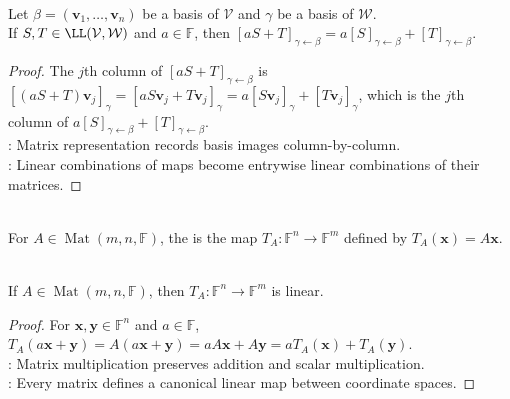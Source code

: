\begin{proposition} \label{prop:matrix-representation-respects-linear-combinations} \\
Let $\beta=(\mathbf{v}_1,\ldots,\mathbf{v}_n)$ be a basis of $\mathcal{V}$ and $\gamma$ be a basis of $\mathcal{W}$.\\
 If $S,T\in\LL(\mathcal{V},\mathcal{W})$ and $a\in\mathbb{F}$, then $[aS+T]_{\gamma \leftarrow \beta}=a[S]_{\gamma \leftarrow \beta}+[T]_{\gamma \leftarrow \beta}$.
\begin{proof}
The $j$th column of $[aS+T]_{\gamma \leftarrow \beta}$ is $[(aS+T)\mathbf{v}_j]_{\gamma}=[aS\mathbf{v}_j+T\mathbf{v}_j]_{\gamma}=a[S\mathbf{v}_j]_{\gamma}+[T\mathbf{v}_j]_{\gamma}$, which is the $j$th column of $a[S]_{\gamma \leftarrow \beta}+[T]_{\gamma \leftarrow \beta}$.\\
: Matrix representation records basis images column-by-column.\\
: Linear combinations of maps become entrywise linear combinations of their matrices.
\end{proof}
\end{proposition}

\begin{definition} \\
For $A\in\operatorname{Mat}(m,n,\mathbb{F})$, the  is the map $T_A:\mathbb{F}^n\to\mathbb{F}^m$ defined by $T_A(\mathbf{x})=A\mathbf{x}$.
\end{definition}

\begin{proposition} \label{prop:matrix-induced-map-linear} \\
If $A\in\operatorname{Mat}(m,n,\mathbb{F})$, then $T_A:\mathbb{F}^n\to\mathbb{F}^m$ is linear.
\begin{proof}
For $\mathbf{x},\mathbf{y}\in\mathbb{F}^n$ and $a\in\mathbb{F}$, $T_A(a\mathbf{x}+\mathbf{y})=A(a\mathbf{x}+\mathbf{y})=aA\mathbf{x}+A\mathbf{y}=aT_A(\mathbf{x})+T_A(\mathbf{y})$.\\
: Matrix multiplication preserves addition and scalar multiplication.\\
: Every matrix defines a canonical linear map between coordinate spaces.
\end{proof}
\end{proposition}

